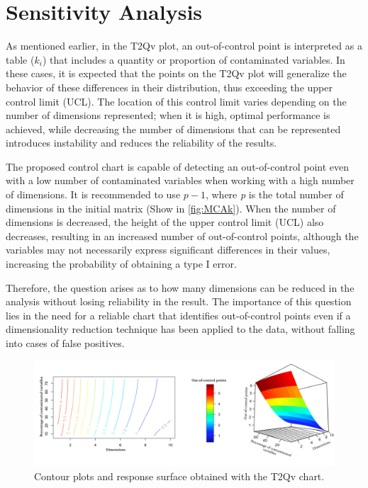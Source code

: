 \documentclass[mathematics,article,submit,moreauthors,pdftex]{mdpi}
\begin{document}
\hypertarget{sensitivity-analysis}{%
\section{Sensitivity Analysis}\label{sensitivity-analysis}}

As mentioned earlier, in the T2Qv plot, an out-of-control point is
interpreted as a table (\(k_i\)) that includes a quantity or proportion
of contaminated variables. In these cases, it is expected that the
points on the T2Qv plot will generalize the behavior of these
differences in their distribution, thus exceeding the upper control
limit (UCL). The location of this control limit varies depending on the
number of dimensions represented; when it is high, optimal performance
is achieved, while decreasing the number of dimensions that can be
represented introduces instability and reduces the reliability of the
results.

The proposed control chart is capable of detecting an out-of-control
point even with a low number of contaminated variables when working with
a high number of dimensions. It is recommended to use \(p-1\), where
\emph{p} is the total number of dimensions in the initial matrix (Show
in \ref{fig:MCAk}). When the number of dimensions is decreased, the
height of the upper control limit (UCL) also decreases, resulting in an
increased number of out-of-control points, although the variables may
not necessarily express significant differences in their values,
increasing the probability of obtaining a type I error.

Therefore, the question arises as to how many dimensions can be reduced
in the analysis without losing reliability in the result. The importance
of this question lies in the need for a reliable chart that identifies
out-of-control points even if a dimensionality reduction technique has
been applied to the data, without falling into cases of false positives.

\begin{figure}[H]


\begin{center}\includegraphics[width=0.9\linewidth,]{sensibilidadi} \end{center}

\caption{Contour plots and response surface obtained with the T2Qv chart.}
\label{fig:sensibilidad}
\end{figure}
\end{document}
